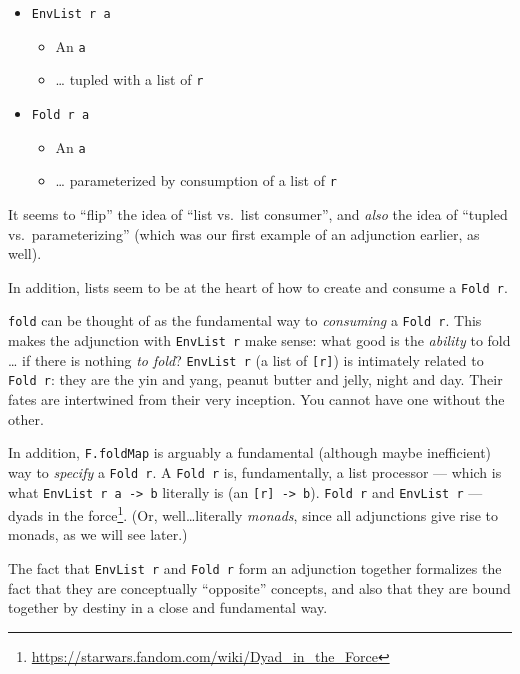 \documentclass[]{article}
\renewcommand{\href}[2]{#2\footnote{\url{#1}}}
\begin{document}
\begin{itemize}
\tightlist
\item
  \texttt{EnvList\ r\ a}

  \begin{itemize}
  \tightlist
  \item
    An \texttt{a}
  \item
    \ldots{} tupled with a list of \texttt{r}
  \end{itemize}
\item
  \texttt{Fold\ r\ a}

  \begin{itemize}
  \tightlist
  \item
    An \texttt{a}
  \item
    \ldots{} parameterized by consumption of a list of \texttt{r}
  \end{itemize}
\end{itemize}

It seems to ``flip'' the idea of ``list vs.~list consumer'', and \emph{also} the
idea of ``tupled vs.~parameterizing'' (which was our first example of an
adjunction earlier, as well).

In addition, lists seem to be at the heart of how to create and consume a
\texttt{Fold\ r}.

\texttt{fold} can be thought of as the fundamental way to \emph{consuming} a
\texttt{Fold\ r}. This makes the adjunction with \texttt{EnvList\ r} make sense:
what good is the \emph{ability} to fold \ldots{} if there is nothing \emph{to
fold}? \texttt{EnvList\ r} (a list of \texttt{{[}r{]}}) is intimately related to
\texttt{Fold\ r}: they are the yin and yang, peanut butter and jelly, night and
day. Their fates are intertwined from their very inception. You cannot have one
without the other.

In addition, \texttt{F.foldMap} is arguably a fundamental (although maybe
inefficient) way to \emph{specify} a \texttt{Fold\ r}. A \texttt{Fold\ r} is,
fundamentally, a list processor --- which is what
\texttt{EnvList\ r\ a\ -\textgreater{}\ b} literally is (an
\texttt{{[}r{]}\ -\textgreater{}\ b}). \texttt{Fold\ r} and \texttt{EnvList\ r}
--- \href{https://starwars.fandom.com/wiki/Dyad_in_the_Force}{dyads in the
force}. (Or, well\ldots literally \emph{monads}, since all adjunctions give rise
to monads, as we will see later.)

The fact that \texttt{EnvList\ r} and \texttt{Fold\ r} form an adjunction
together formalizes the fact that they are conceptually ``opposite'' concepts,
and also that they are bound together by destiny in a close and fundamental way.
\end{document}
